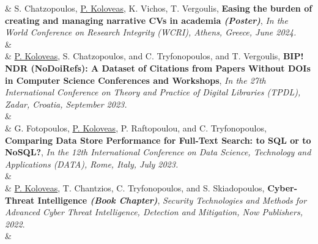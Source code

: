 %
\nohyphens{\color{gray}{Publications}} 
& S. Chatzopoulos, \underline{P. Koloveas}, K. Vichos, T. Vergoulis, \textbf{Easing the burden of creating and managing narrative CVs in academia \textit{(Poster)}}, \textit{In the World Conference on Research Integrity (WCRI), Athens, Greece, June 2024.} \\
& \\ [-5pt]

& \underline{P. Koloveas}, S. Chatzopoulos, and C. Tryfonopoulos, and T. Vergoulis, \textbf{BIP! NDR (NoDoiRefs): A Dataset of Citations from Papers Without DOIs in Computer Science Conferences and Workshops}, \textit{In the 27th International Conference on Theory and Practice of Digital Libraries (TPDL), Zadar, Croatia, September 2023.} \\
&  \\ [-5pt]


& G. Fotopoulos, \underline{P. Koloveas}, P. Raftopoulou, and C. Tryfonopoulos, \textbf{Comparing Data Store Performance for Full-Text Search: to SQL or to NoSQL?}, \textit{In the 12th International Conference on Data Science, Technology and Applications (DATA), Rome, Italy, July 2023.} \\
& \\[-5pt]


& \underline{P. Koloveas}, T. Chantzios, C. Tryfonopoulos, and S. Skiadopoulos, \textbf{Cyber-Threat Intelligence \textit{(Book Chapter)}}, \textit{Security Technologies and Methods for Advanced Cyber Threat Intelligence, Detection and Mitigation, Now Publishers, 2022}. \\
& \\ [-5pt]

